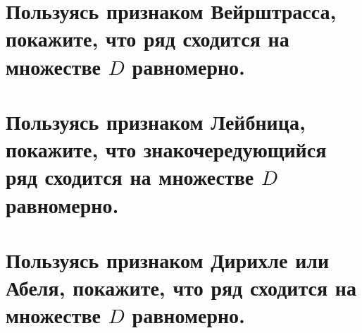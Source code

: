\documentclass[a4paper, fleqn]{article}
\begin{document}
    
    \section*{Пользуясь признаком Вейрштрасса, покажите, что ряд сходится на множестве $D$ равномерно.}
    
    
    
    
    \section*{Пользуясь признаком Лейбница, покажите, что знакочередующийся ряд сходится на множестве $D$
        равномерно.}
    
    
    \section*{Пользуясь признаком Дирихле или Абеля, покажите, что ряд сходится на множестве $D$ равномерно.}
    
    
    
    
\end{document}
